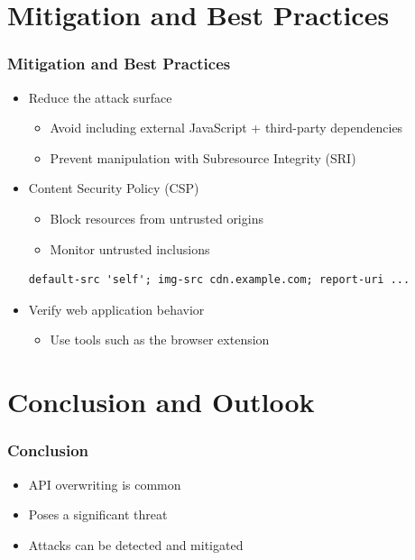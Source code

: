 \documentclass[t,aspectratio=169]{beamer}
\begin{document}
\section{Mitigation and Best Practices}

\begin{frame}[fragile]
	\frametitle{Mitigation and Best Practices}
	\begin{itemize}
		\item Reduce the attack surface
		\begin{itemize}
			\item Avoid including external JavaScript + third-party dependencies
			\item Prevent manipulation with Subresource Integrity (SRI)
		\end{itemize}
		\item Content Security Policy (CSP)
		\begin{itemize}
			\item Block resources from untrusted origins
			\item Monitor untrusted inclusions
		\end{itemize}
		\begin{lstlisting}[language=CSP,numbers=none]
default-src 'self'; img-src cdn.example.com; report-uri ...
		\end{lstlisting}
		\item Verify web application behavior
		\begin{itemize}
			\item Use tools such as the browser extension
		\end{itemize}
	\end{itemize}
\end{frame}

\section{Conclusion and Outlook}

\begin{frame}
	\frametitle{Conclusion}
	\begin{itemize}
		\item API overwriting is common
		\item Poses a significant threat
		\item Attacks can be detected and mitigated
	\end{itemize}
\end{frame}
\end{document}
